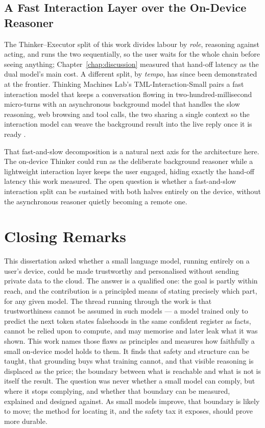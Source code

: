\subsection{A Fast Interaction Layer over the On-Device Reasoner}
\label{subsec:conclusion-future-interaction}

The Thinker--Executor split of this work divides labour by \emph{role}, reasoning against acting, and runs the two sequentially, so the user waits for the whole chain before seeing anything; Chapter~\ref{chap:discussion} measured that hand-off latency as the dual model's main cost. A different split, by \emph{tempo}, has since been demonstrated at the frontier. Thinking Machines Lab's TML-Interaction-Small pairs a fast interaction model that keeps a conversation flowing in two-hundred-millisecond micro-turns with an asynchronous background model that handles the slow reasoning, web browsing and tool calls, the two sharing a single context so the interaction model can weave the background result into the live reply once it is ready \cite{thinkingmachines2026interaction}.

That fast-and-slow decomposition is a natural next axis for the architecture here. The on-device Thinker could run as the deliberate background reasoner while a lightweight interaction layer keeps the user engaged, hiding exactly the hand-off latency this work measured. The open question is  whether a fast-and-slow interaction split can be sustained with both halves entirely on the device, without the asynchronous reasoner quietly becoming a remote one.

\section{Closing Remarks}
\label{sec:conclusion-closing}

This dissertation asked whether a small language model, running entirely on a user's device, could be made trustworthy and personalised without sending private data to the cloud. The answer is a qualified one: the goal is partly within reach, and the contribution is a principled means of stating precisely which part, for any given model. The thread running through the work is that trustworthiness cannot be assumed in such models --- a model trained only to predict the next token states falsehoods in the same confident register as facts, cannot be relied upon to compute, and may memorise and later leak what it was shown. This work names those flaws as principles and measures how faithfully a small on-device model holds to them. It finds that safety and structure can be taught, that grounding buys what training cannot, and that visible reasoning is displaced as the price; the boundary between what is reachable and what is not is itself the result. The question was never whether a small model can comply, but where it stops complying, and whether that boundary can be measured, explained and designed against. As small models improve, that boundary is likely to move; the method for locating it, and the safety tax it exposes, should prove more durable.
